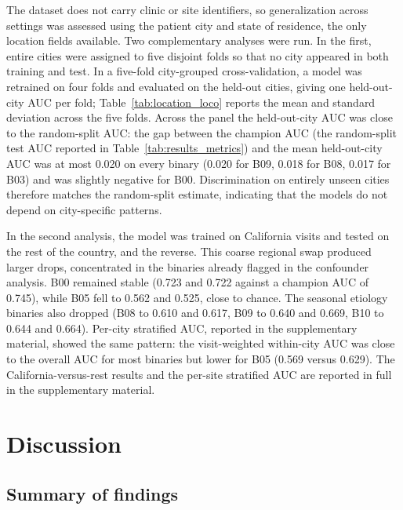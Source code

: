 \documentclass[utf8]{FrontiersinHarvard} %
\begin{document}
The dataset does not carry clinic or site identifiers, so generalization across settings was assessed using the patient city and state of residence, the only location fields available. Two complementary analyses were run. In the first, entire cities were assigned to five disjoint folds so that no city appeared in both training and test. In a five-fold city-grouped cross-validation, a model was retrained on four folds and evaluated on the held-out cities, giving one held-out-city AUC per fold; Table~\ref{tab:location_loco} reports the mean and standard deviation across the five folds. Across the panel the held-out-city AUC was close to the random-split AUC: the gap between the champion AUC (the random-split test AUC reported in Table~\ref{tab:results_metrics}) and the mean held-out-city AUC was at most 0.020 on every binary (0.020 for B09, 0.018 for B08, 0.017 for B03) and was slightly negative for B00. Discrimination on entirely unseen cities therefore matches the random-split estimate, indicating that the models do not depend on city-specific patterns.

In the second analysis, the model was trained on California visits and tested on the rest of the country, and the reverse. This coarse regional swap produced larger drops, concentrated in the binaries already flagged in the confounder analysis. B00 remained stable (0.723 and 0.722 against a champion AUC of 0.745), while B05 fell to 0.562 and 0.525, close to chance. The seasonal etiology binaries also dropped (B08 to 0.610 and 0.617, B09 to 0.640 and 0.669, B10 to 0.644 and 0.664). Per-city stratified AUC, reported in the supplementary material, showed the same pattern: the visit-weighted within-city AUC was close to the overall AUC for most binaries but lower for B05 (0.569 versus 0.629). The California-versus-rest results and the per-site stratified AUC are reported in full in the supplementary material.

\section{Discussion}
\label{sec:discussion}

\subsection{Summary of findings}
\end{document}
